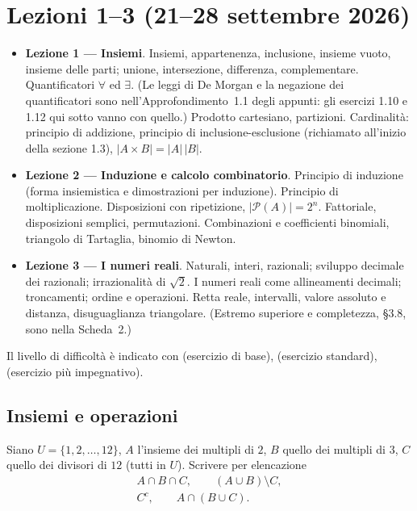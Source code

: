\chapter{Lezioni 1--3 (21--28 settembre 2026)}

\begin{vuoto}{}
\begin{itemize}
\item[\bul] \textbf{Lezione 1 --- Insiemi}. Insiemi, appartenenza, inclusione, insieme vuoto, insieme delle parti; unione, intersezione, differenza, complementare. Quantificatori $\forall$ ed $\exists$. (Le leggi di De Morgan e la negazione dei quantificatori sono nell'Approfondimento~1.1 degli appunti: gli esercizi 1.10 e 1.12 qui sotto vanno con quello.) Prodotto cartesiano, partizioni. Cardinalit\`a: principio di addizione, principio di inclusione-esclusione (richiamato all'inizio della sezione 1.3), $|A\times B|=|A|\,|B|$.
\item[\bul] \textbf{Lezione 2 --- Induzione e calcolo combinatorio}. Principio di induzione (forma insiemistica e dimostrazioni per induzione). Principio di moltiplicazione. Disposizioni con ripetizione, $|\mathcal P(A)|=2^{n}$. Fattoriale, disposizioni semplici, permutazioni. Combinazioni e coefficienti binomiali, triangolo di Tartaglia, binomio di Newton.
\item[\bul] \textbf{Lezione 3 --- I numeri reali}. Naturali, interi, razionali; sviluppo decimale dei razionali; irrazionalit\`a di $\sqrt2$. I numeri reali come allineamenti decimali; troncamenti; ordine e operazioni. Retta reale, intervalli, valore assoluto e distanza, disuguaglianza triangolare. (Estremo superiore e completezza, \S3.8, sono nella Scheda~2.)
\end{itemize}
\end{vuoto}

Il livello di difficolt\`a \`e indicato con  (esercizio di base),  (esercizio standard),  (esercizio pi\`u impegnativo).

\section{Insiemi e operazioni}

\begin{esercizio}[\liv{1}]
Siano $U=\{1,2,\ldots,12\}$, $A$ l'insieme dei multipli di $2$, $B$ quello dei multipli di $3$, $C$ quello dei divisori di $12$ (tutti in $U$). Scrivere per elencazione
\begin{gather*}
A\cap B\cap C,\qquad (A\cup B)\setminus C,\\
C^{c},\qquad A\cap(B\cup C).
\end{gather*}
\end{esercizio}

